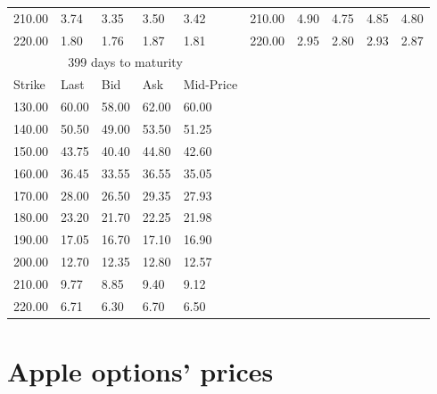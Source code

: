 \documentclass[12pt,a4paper]{report}
\begin{document}
\begin{appendices}
\begin{longtable}{|lllll|lllll|}
  210.00 & 3.74 & 3.35 & 3.50 & 3.42 &  210.00 & 4.90 & 4.75 & 4.85 & 4.80 \\*
  220.00 & 1.80 & 1.76 & 1.87 & 1.81 &  220.00 & 2.95 & 2.80 & 2.93 & 2.87 \\
  \hline
  \multicolumn{5}{|c|}{399 days to maturity} \\*
  \cline{1-5}
  Strike & Last & Bid & Ask & Mid-Price \\*
  \cline{1-5}
  130.00 & 60.00 & 58.00 & 62.00 & 60.00 \\*
  140.00 & 50.50 & 49.00 & 53.50 & 51.25 \\*
  150.00 & 43.75 & 40.40 & 44.80 & 42.60 \\*
  160.00 & 36.45 & 33.55 & 36.55 & 35.05 \\*
  170.00 & 28.00 & 26.50 & 29.35 & 27.93 \\*
  180.00 & 23.20 & 21.70 & 22.25 & 21.98 \\*
  190.00 & 17.05 & 16.70 & 17.10 & 16.90 \\*
  200.00 & 12.70 & 12.35 & 12.80 & 12.57 \\*
  210.00 & 9.77 & 8.85 & 9.40 & 9.12 \\*
  220.00 & 6.71 & 6.30 & 6.70 & 6.50 \\
  \cline{1-5}
\end{longtable}


\section{Apple options' prices}
\label{sec:appendix:option}


\end{appendices}
\end{document}

